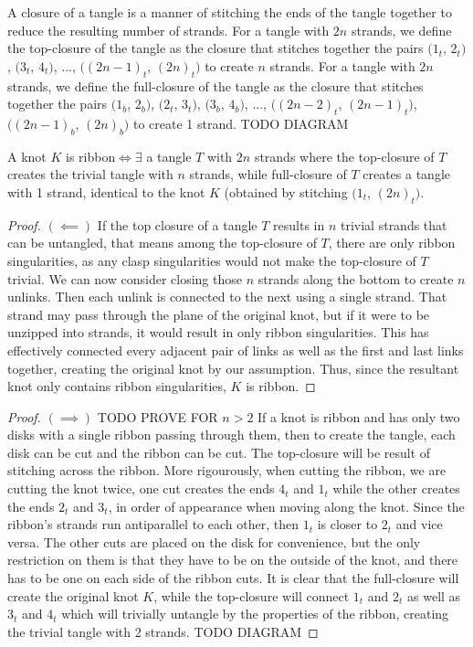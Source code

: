 \begin{paper}
A closure of a tangle is a manner of stitching the ends of the tangle together
to reduce the resulting number of strands.
For a tangle with $2n$ strands, we define the top-closure of the tangle as the
closure that stitches together the pairs $(1_t$, $2_t)$, $(3_t$, $4_t)$, ...,
$((2n-1)_t$, $(2n)_t)$ to create $n$ strands.
For a tangle with $2n$ strands, we define the full-closure of the tangle as the
closure that stitches together the pairs $(1_b$, $2_b)$, $(2_t$, $3_t)$, $(3_b$,
$4_b)$, ..., $((2n-2)_t$, $(2n-1)_t)$, $((2n-1)_b$, $(2n)_b)$ to create 1
strand.
TODO DIAGRAM
\begin{theorem}
A knot $K$ is ribbon$\iff\exists$ a tangle $T$ with $2n$ strands where the
top-closure of $T$ creates the trivial tangle with $n$ strands, while
full-closure of $T$ creates a tangle with 1 strand, identical to the knot $K$
(obtained by stitching $(1_t$, $(2n)_t)$.
\end{theorem}
\begin{proof}
$(\impliedby)$
If the top closure of a tangle $T$ results in $n$ trivial strands that can be
untangled, that means among the top-closure of $T$, there are only ribbon
singularities, as any clasp singularities would not make the top-closure of $T$
trivial.
We can now consider closing those $n$ strands along the bottom to create $n$
unlinks.
Then each unlink is connected to the next using a single strand.
That strand may pass through the plane of the original knot, but if it were to
be unzipped into strands, it would result in only ribbon singularities.
This has effectively connected every adjacent pair of links as well as the first
and last links together, creating the original knot by our assumption.
Thus, since the resultant knot only contains ribbon singularities, $K$ is
ribbon.
\end{proof}
\begin{proof}
$(\implies)$
TODO PROVE FOR $n>2$
If a knot is ribbon and has only two disks with a single ribbon passing through
them, then to create the tangle, each disk can be cut and the ribbon can be cut.
The top-closure will be result of stitching across the ribbon.
More rigourously, when cutting the ribbon, we are cutting the knot twice, one
cut creates the ends $4_t$ and $1_t$ while the other creates the ends $2_t$ and
$3_t$, in order of appearance when moving along the knot.
Since the ribbon's strands run antiparallel to each other, then $1_t$ is closer
to $2_t$ and vice versa.
The other cuts are placed on the disk for convenience, but the only restriction
on them is that they have to be on the outside of the knot, and there has to be
one on each side of the ribbon cuts.
It is clear that the full-closure will create the original knot $K$, while the
top-closure will connect $1_t$ and $2_t$ as well as $3_t$ and $4_t$ which will
trivially untangle by the properties of the ribbon, creating the trivial tangle
with 2 strands.
TODO DIAGRAM
\end{proof}


\end{paper}
